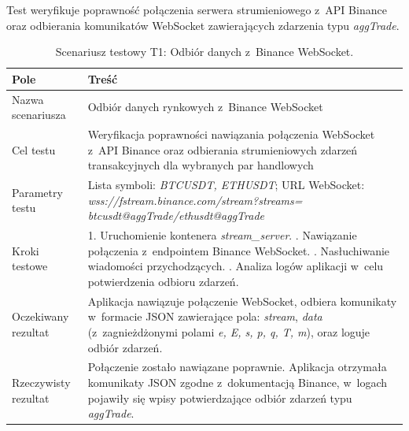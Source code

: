 Test weryfikuje poprawność połączenia serwera strumieniowego z~API Binance oraz odbierania komunikatów WebSocket
zawierających zdarzenia typu \textit{aggTrade}.

\vspace{0.5cm}

\begin{table}[H]
    \centering
    \caption{Scenariusz testowy T1: Odbiór danych z~Binance WebSocket.}
    \label{tab:test_binance_websocket}
    \begin{tabular}{|p{}|p{}|}
        \hline
        \textbf{Pole}        & \textbf{Treść}                                                                                                                                                                                                                                      \\ \hline
        Nazwa scenariusza    & Odbiór danych rynkowych z~Binance WebSocket                                                                                                                                                                                                         \\ \hline
        Cel testu            & Weryfikacja poprawności nawiązania połączenia WebSocket z~API Binance oraz odbierania strumieniowych zdarzeń transakcyjnych dla wybranych par handlowych                                                                                            \\ \hline
        Parametry testu      & Lista symboli: \textit{BTCUSDT, ETHUSDT}; URL WebSocket: \textit{wss://fstream.binance.com/stream?streams=} \newline \textit{btcusdt@aggTrade/ethusdt@aggTrade}                                                                                     \\ \hline
        Kroki testowe        & 1. Uruchomienie kontenera \textit{stream\_server}. \newline 2. Nawiązanie połączenia z~endpointem Binance WebSocket. \newline 3. Nasłuchiwanie wiadomości przychodzących. \newline 4. Analiza logów aplikacji w~celu potwierdzenia odbioru zdarzeń. \\ \hline
        Oczekiwany rezultat  & Aplikacja nawiązuje połączenie WebSocket, odbiera komunikaty w~formacie JSON zawierające pola: \textit{stream}, \textit{data} (z~zagnieżdżonymi polami \textit{e, E, s, p, q, T, m}), oraz loguje odbiór zdarzeń.                                   \\ \hline
        Rzeczywisty rezultat & Połączenie zostało nawiązane poprawnie. Aplikacja otrzymała komunikaty JSON zgodne z~dokumentacją Binance, w~logach pojawiły się wpisy potwierdzające odbiór zdarzeń typu \textit{aggTrade}.                                                        \\ \hline
    \end{tabular}
\end{table}

